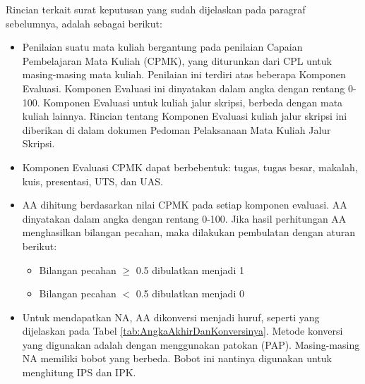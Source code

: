 Rincian terkait surat keputusan yang sudah dijelaskan pada paragraf sebelumnya, adalah sebagai berikut:
\begin{itemize}
	\item Penilaian suatu mata kuliah bergantung pada penilaian Capaian Pembelajaran Mata Kuliah
(CPMK), yang diturunkan dari CPL untuk masing-masing mata kuliah. Penilaian ini terdiri atas
beberapa Komponen Evaluasi. Komponen Evaluasi ini dinyatakan dalam angka dengan rentang
0-100. Komponen Evaluasi untuk kuliah jalur skripsi, berbeda dengan mata kuliah lainnya. Rincian
tentang Komponen Evaluasi kuliah jalur skripsi ini diberikan di dalam dokumen Pedoman
Pelaksanaan Mata Kuliah Jalur Skripsi.
	
	\item Komponen Evaluasi CPMK dapat berbebentuk: tugas, tugas besar, makalah, kuis, presentasi, UTS,
dan UAS.

	\item AA dihitung berdasarkan nilai CPMK pada setiap komponen evaluasi. AA dinyatakan dalam angka
dengan rentang 0-100. Jika hasil perhitungan AA menghasilkan bilangan pecahan, maka dilakukan
pembulatan dengan aturan berikut:
	\begin{itemize}
			\item Bilangan pecahan $\geq$ 0.5 dibulatkan menjadi 1
			\item Bilangan pecahan $<$ 0.5 dibulatkan menjadi 0
		\end{itemize}
		
		\item Untuk mendapatkan NA, AA dikonversi menjadi huruf, seperti yang dijelaskan pada Tabel \ref{tab:AngkaAkhirDanKonversinya}. Metode konversi yang digunakan adalah dengan menggunakan patokan (PAP). Masing-masing NA memiliki bobot yang berbeda. Bobot ini nantinya digunakan untuk menghitung IPS dan IPK.
		

\end{itemize}
